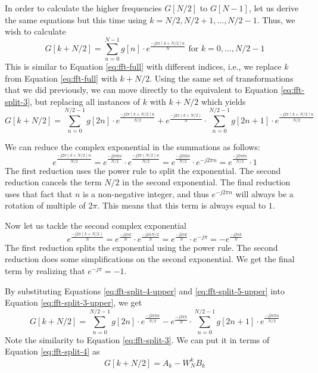 In order to calculate the higher frequencies $G[N/2]$ to $G[N-1]$, let us derive the same equations but this time using $k = N/2, N/2 + 1, \dots, N/2 -1$.  Thus, we wish to calculate
\begin{equation}
G[k + N/2] = \displaystyle\sum\limits_{n=0}^{N-1} g[n] \cdot e^{\frac{-j 2 \pi (k + N/2) n}{N}} \text{ for } k = 0, \dots, N/2 - 1
\label{eq:fft-upper}
\end{equation}
This is similar to Equation \ref{eq:fft-full} with different indices, i.e., we replace $k$ from Equation \ref{eq:fft-full} with $k + N/2$. Using the same set of transformations that we did previously, we can move directly to the equivalent to Equation \ref{eq:fft-split-3}, but replacing all instances of $k$ with $k + N/2$ which yields 
\begin{equation}
G[k + N/2] = \displaystyle\sum\limits_{n=0}^{N/2-1} g[2n] \cdot e^{\frac{-j 2 \pi (k + N/2) n}{N/2}} + e^{\frac{-j 2 \pi (k + N/2)}{N}} \cdot \displaystyle\sum\limits_{n=0}^{N/2-1} g[2n+1] \cdot e^{\frac{-j 2 \pi (k + N/2) n}{N/2}} 
\label{eq:fft-split-3-upper}
\end{equation}

We can reduce the complex exponential in the summations as follows:
\begin{equation}
e^{\frac{-j 2 \pi (k + N/2) n}{N/2}} = e^{\frac{-j 2 \pi k n}{N/2}} \cdot e^{\frac{-j 2 \pi (N/2) n}{N/2}} = e^{\frac{-j 2 \pi k n}{N/2}} \cdot e^{-j 2 \pi n} = e^{\frac{-j 2 \pi k n}{N/2}} \cdot 1
\label{eq:fft-split-4-upper}
\end{equation}
The first reduction uses the power rule to split the exponential. The second reduction cancels the term $N/2$ in the second exponential. The final reduction uses that fact that $n$ is a non-negative integer, and thus $e^{-j 2 \pi n}$ will always be a rotation of multiple of $2 \pi$. This means that this term is always equal to $1$. 

Now let us tackle the second complex exponential
\begin{equation}
e^{\frac{-j 2 \pi (k + N/2)}{N}} = e^{\frac{-j 2 \pi k }{N}} \cdot e^{\frac{-j 2 \pi N/2 }{N}} = e^{\frac{-j 2 \pi k }{N}} \cdot e^{-j  \pi} = - e^{\frac{-j 2 \pi k }{N}}
\label{eq:fft-split-5-upper}
\end{equation}
The first reduction splits the exponential using the power rule. The second reduction does some simplifications on the second exponential. We get the final term by realizing that $e^{-j \pi} = -1$.

By substituting Equations \ref{eq:fft-split-4-upper} and \ref{eq:fft-split-5-upper} into Equation \ref{eq:fft-split-3-upper}, we get
\begin{equation}
G[k + N/2] = \displaystyle\sum\limits_{n=0}^{N/2-1} g[2n] \cdot e^{\frac{-j 2 \pi k n}{N/2}} - e^{\frac{-j 2 \pi k}{N}} \cdot \displaystyle\sum\limits_{n=0}^{N/2-1} g[2n+1] \cdot e^{\frac{-j 2 \pi k n}{N/2}} 
\label{eq:fft-split-6-upper}
\end{equation}
Note the similarity to Equation \ref{eq:fft-split-3}. We can put it in terms of Equation \ref{eq:fft-split-4} as
\begin{equation}
G[k + N/2] = A_k - W_N^k B_k 
\label{eq:fft-split-7-upper}
\end{equation}

